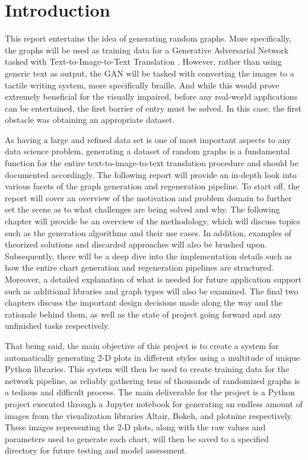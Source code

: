 \chapter{Introduction}
This report entertains the idea of generating random graphs. More specifically, the graphs will be used as training data for a Generative Adversarial Network tasked with Text-to-Image-to-Text Translation \cite{hu2021text}. However, rather than using generic text as output, the GAN will be tasked with converting the images to a tactile writing system, more specifically braille. And while this would prove extremely beneficial for the visually impaired, before any real-world applications can be entertained, the first barrier of entry must be solved. In this case, the first obstacle was obtaining an appropriate dataset.

\hfill

As having a large and refined data set is one of most important aspects to any data science problem, generating a dataset of random graphs is a fundamental function for the entire text-to-image-to-text translation procedure and should be documented accordingly. The following report will provide an in-depth look into various facets of the graph generation and regeneration pipeline. To start off, the report will cover an overview of the motivation and problem domain to further set the scene as to what challenges are being solved and why. The following chapter will provide be an overview of the methodology, which will discuss topics such as the generation algorithms and their use cases. In addition, examples of theorized solutions and discarded approaches will also be brushed upon. Subsequently, there will be a deep dive into the implementation details such as how the entire chart generation and regeneration pipelines are structured. Moreover, a detailed explanation of what is needed for future application support such as additional libraries and graph types will also be examined. The final two chapters discuss the important design decisions made along the way and the rationale behind them, as well as the state of project going forward and any unfinished tasks respectively.

\hfill

That being said, the main objective of this project is to create a system for automatically generating 2-D plots in different styles using a multitude of unique Python libraries. This system will then be used to create training data for the network pipeline, as reliably gathering tens of thousands of randomized graphs is a tedious and difficult process. The main deliverable for the project is a Python project executed through a Jupyter notebook for generating an endless amount of images from the visualization libraries Altair, Bokeh, and plotnine respectively. These images representing the 2-D plots, along with the raw values and parameters used to generate each chart, will then be saved to a specified directory for future testing and model assessment. 